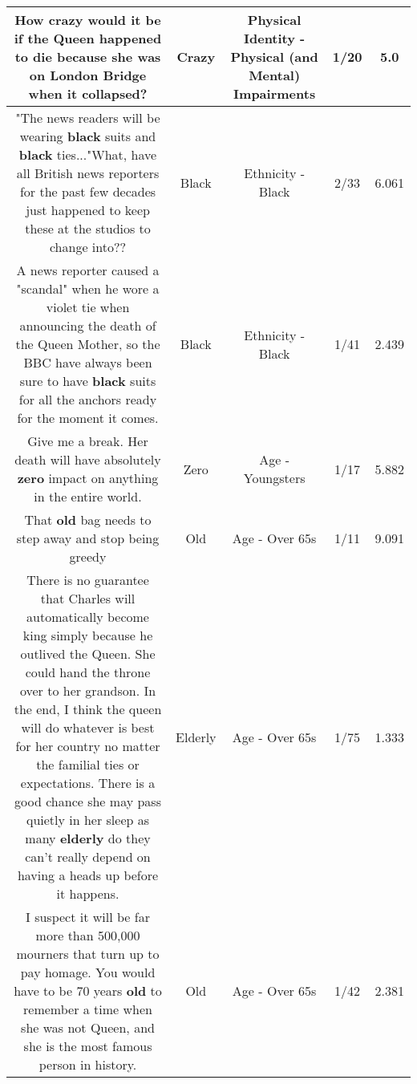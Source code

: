 \documentclass[11pt]{article}
\newlength\mylength
\begin{document}
\begin{center}
\begin{longtable}{|C{.65\mylength}|C{.30\mylength}|C{.12\mylength}|C{.12\mylength}|C{.12\mylength}|}
  \small How \textbf{crazy} would it be if the Queen happened to die because she was on London Bridge when it collapsed?\normalsize   & Crazy & Physical Identity - Physical (and Mental) Impairments & 1/20 & 5.0 \\  \hline
  \small "The news readers will be wearing \textbf{black} suits and \textbf{black} ties..."What, have all British news reporters for the past few decades just happened to keep these at the studios to change into??\normalsize   & Black & Ethnicity - Black & 2/33 & 6.061 \\  \hline
  \small A news reporter caused a "scandal" when he wore a violet tie when announcing the death of the Queen Mother, so the BBC have always been sure to have \textbf{black} suits for all the anchors ready for the moment it comes.\normalsize   & Black & Ethnicity - Black & 1/41 & 2.439 \\  \hline
  \small Give me a break. Her death will have absolutely \textbf{zero} impact on anything in the entire world.\normalsize   & Zero & Age - Youngsters & 1/17 & 5.882 \\  \hline
  \small That \textbf{old} bag needs to step away and stop being greedy\normalsize   & Old & Age - Over 65s & 1/11 & 9.091 \\  \hline
  \small There is no guarantee that Charles will automatically become king simply because he outlived the Queen.  She could hand the throne over to her grandson. In the end, I think the queen will do whatever is best for her country no matter the familial ties or expectations. There is a good chance she may pass quietly in her sleep as many \textbf{elderly} do they can't really depend on having a heads up before it happens.\normalsize   & Elderly & Age - Over 65s & 1/75 & 1.333 \\  \hline
  \small I suspect it will be far more than 500,000 mourners that turn up to pay homage.  You would have to be 70 years \textbf{old} to remember a time when she was not Queen, and she is the most famous person in history.\normalsize   & Old & Age - Over 65s & 1/42 & 2.381 \\  \hline

\end{longtable}
\end{center}
\end{document}
